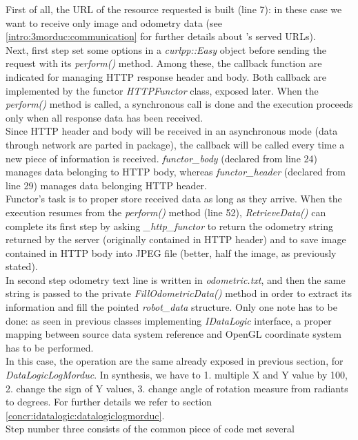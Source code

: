 First of all, the URL of the resource requested is built (line 7):
in these case we want to receive only image and odometry data
(see \ref{intro:3morduc:communication} for further details about
\morduc{}'s served URLs).
\\
Next, first step set some options in a \textit{curlpp::Easy} object
before sending the request with its \textit{perform()} method. Among
these, the callback function are indicated for managing HTTP response
header and body. Both callback are implemented by the functor
\textit{HTTPFunctor} class, exposed later. When the \textit{perform()}
method is called, a synchronous call is done and the execution proceeds
only when all response data has been received.
\\
Since HTTP header and body will be received in an asynchronous mode
(data through network are parted in package), the callback will be
called every time a new piece of information is received.
\textit{functor\_body} (declared from line 24) manages data belonging
to HTTP body, whereas \textit{functor\_header} (declared from line 29)
manages data belonging HTTP header.
\\
Functor's task is to proper store received data as long as they arrive.
When the execution resumes from the \textit{perform()} method (line 52),
\textit{RetrieveData()} can complete its first step by asking
\textit{\_http\_functor} to return the odometry string returned by the server
(originally contained in HTTP header) and to save image contained in
HTTP body into JPEG file (better, half the image, as previously stated).
\\
In second step odometry text line is written in \textit{odometric.txt},
and then the same string is passed to the private \textit{FillOdometricData()}
method in order to extract its information and fill the pointed
\textit{robot\_data} structure. Only one note has to be done: as seen
in previous classes implementing \textit{IDataLogic} interface, a
proper mapping between source data system reference and OpenGL coordinate
system has to be performed.
\\
In this case, the operation are the same already exposed in previous section,
for \textit{DataLogicLogMorduc}. In synthesis, we have to 1. multiple X and Y
value by 100, 2. change the sign of  Y values, 3. change angle of rotation
measure from radiants to degrees. For further details we refer to section
\ref{concr:idatalogic:datalogiclogmorduc}.
\\
Step number three consists of the common piece of code met several
